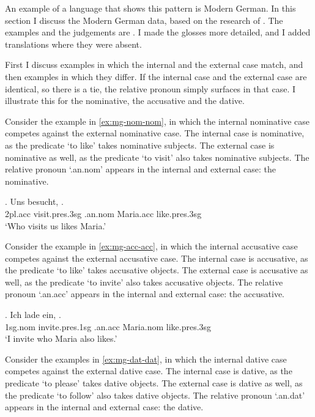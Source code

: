 An example of a language that shows this pattern is Modern German. In this section I discuss the Modern German data, based on the research of \citet{vogel2001}. The examples and the judgements are . I made the glosses more detailed, and I added translations where they were absent.

First I discuss examples in which the internal and the external case match, and then examples in which they differ. If the internal case and the external case are identical, so there is a tie, the relative pronoun simply surfaces in that case. I illustrate this for the nominative, the accusative and the dative.

Consider the example in \ref{ex:mg-nom-nom}, in which the internal nominative case competes against the external nominative case.
The internal case is nominative, as the predicate  `to like' takes nominative subjects.
The external case is nominative as well, as the predicate  `to visit' also takes nominative subjects.
The relative pronoun  `.\ac{an}.\ac{nom}' appears in the internal and external case: the nominative.

\exg. Uns besucht,   .\\
 2\ac{pl}.\ac{acc} visit.\ac{pres}.3\ac{sg}\scsub{[nom]} .\ac{an}.\ac{nom} Maria.\ac{acc} like.\ac{pres}.3\ac{sg}\scsub{[nom]}\\
 `Who visits us likes Maria.' \label{ex:mg-nom-nom}

Consider the example in \ref{ex:mg-acc-acc}, in which the internal accusative case competes against the external accusative case.
The internal case is accusative, as the predicate  `to like' takes accusative objects.
The external case is accusative as well, as the predicate  `to invite' also takes accusative objects.
The relative pronoun  `.\ac{an}.\ac{acc}' appears in the internal and external case: the accusative.

\exg. Ich {lade ein},    .\\
 1\ac{sg}.\ac{nom} invite.\ac{pres}.1\ac{sg}\scsub{[acc]} .\ac{an}.\ac{acc} Maria.\ac{nom} like.\ac{pres}.3\ac{sg}\scsub{[acc]}\\
 `I invite who Maria also likes.' \label{ex:mg-acc-acc}

Consider the examples in \ref{ex:mg-dat-dat}, in which the internal dative case competes against the external dative case.
The internal case is dative, as the predicate  `to please' takes dative objects.
The external case is dative as well, as the predicate  `to follow' also takes dative objects.
The relative pronoun  `.\ac{an}.\ac{dat}' appears in the internal and external case: the dative.

